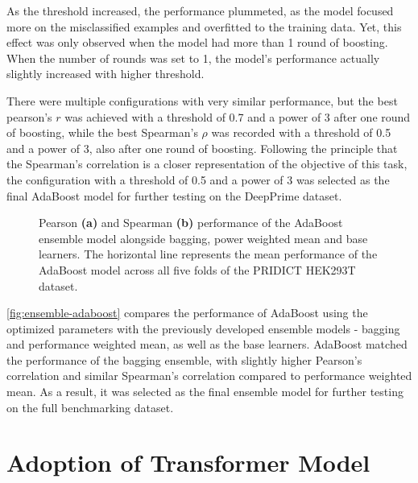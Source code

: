 As the threshold increased, the performance plummeted, as the model focused more on the misclassified examples and overfitted to the training data. Yet, this effect was only observed when the model had more than 1 round of boosting. When the number of rounds was set to 1, the model's performance actually slightly increased with higher threshold. 

There were multiple configurations with very similar performance, but the best pearson's $r$ was achieved with a threshold of 0.7 and a power of 3 after one round of boosting, while the best Spearman's $\rho$ was recorded with a threshold of 0.5 and a power of 3, also after one round of boosting. Following the principle that the Spearman's correlation is a closer representation of the objective of this task, the configuration with a threshold of 0.5 and a power of 3 was selected as the final AdaBoost model for further testing on the DeepPrime dataset.

\begin{figure}
    \centering
    \caption[AdaBoost Ensemble Model Performance]{Pearson \textbf{(a)} and Spearman \textbf{(b)} performance of the AdaBoost ensemble model alongside bagging, power weighted mean and base learners. The horizontal line represents the mean performance of the AdaBoost model across all five folds of the PRIDICT HEK293T dataset.}
    \label{fig:ensemble-adaboost}
\end{figure}

\autoref{fig:ensemble-adaboost} compares the performance of AdaBoost using the optimized parameters with the previously developed ensemble models - bagging and performance weighted mean, as well as the base learners. AdaBoost matched the performance of the bagging ensemble, with slightly higher Pearson's correlation and similar Spearman's correlation compared to performance weighted mean. As a result, it was selected as the final ensemble model for further testing on the full benchmarking dataset.

\section{Adoption of Transformer Model}

